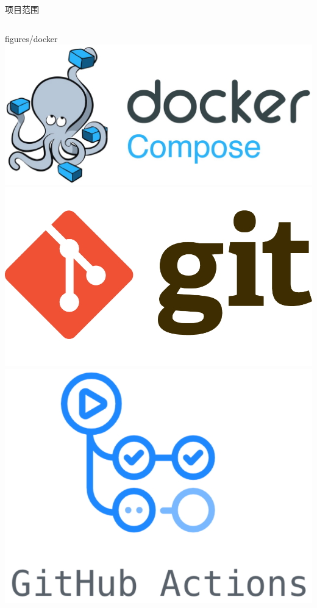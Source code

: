 \documentclass{beamer}
\begin{document}
\begin{frame}[fragile]{项目范围}
\begin{columns}
\begin{column}{0.15\textwidth}
{figures/docker}
\includegraphics[width=\textwidth]
{figures/docker_compose}
\includegraphics[width=\textwidth]
{figures/git}
\includegraphics[width=\textwidth]
{figures/github_actions}
\end{column}
\end{columns}
\end{frame}
\end{document}
